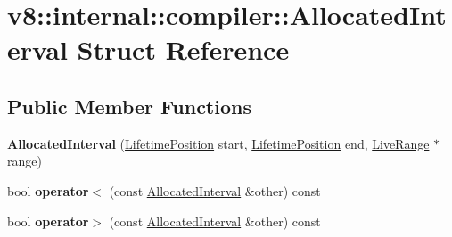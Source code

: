 \hypertarget{structv8_1_1internal_1_1compiler_1_1_allocated_interval}{}\section{v8\+:\+:internal\+:\+:compiler\+:\+:Allocated\+Interval Struct Reference}
\label{structv8_1_1internal_1_1compiler_1_1_allocated_interval}
\subsection*{Public Member Functions}
\begin{DoxyCompactItemize}
\item 
{\bfseries Allocated\+Interval} (\hyperlink{classv8_1_1internal_1_1compiler_1_1_lifetime_position}{Lifetime\+Position} start, \hyperlink{classv8_1_1internal_1_1compiler_1_1_lifetime_position}{Lifetime\+Position} end, \hyperlink{classv8_1_1internal_1_1compiler_1_1_live_range}{Live\+Range} $\ast$range)\hypertarget{structv8_1_1internal_1_1compiler_1_1_allocated_interval_a97341cd7e61929ffab012657f8b0ec58}{}\label{structv8_1_1internal_1_1compiler_1_1_allocated_interval_a97341cd7e61929ffab012657f8b0ec58}

\item 
bool {\bfseries operator$<$} (const \hyperlink{structv8_1_1internal_1_1compiler_1_1_allocated_interval}{Allocated\+Interval} \&other) const \hypertarget{structv8_1_1internal_1_1compiler_1_1_allocated_interval_abdf129f7851a9bcee7b434e9695cebdd}{}\label{structv8_1_1internal_1_1compiler_1_1_allocated_interval_abdf129f7851a9bcee7b434e9695cebdd}

\item 
bool {\bfseries operator$>$} (const \hyperlink{structv8_1_1internal_1_1compiler_1_1_allocated_interval}{Allocated\+Interval} \&other) const \hypertarget{structv8_1_1internal_1_1compiler_1_1_allocated_interval_a198cb61f14b9887a954eab6373bd928c}{}\label{structv8_1_1internal_1_1compiler_1_1_allocated_interval_a198cb61f14b9887a954eab6373bd928c}

\end{DoxyCompactItemize}
